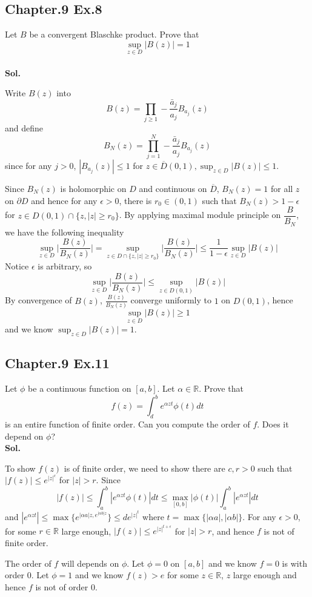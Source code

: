 \documentclass[lang=en,11pt,a4paper,citestyle =authoryear]{elegantpaper}
\newcommand{\R}{\mathbb{R}}
\begin{document}
\subsection*{Chapter.9 Ex.8} 
Let $B$ be a convergent Blaschke product. Prove that
\[\sup_{z\in D} |B(z)| = 1\]
\vspace{0.5em}\\
\textbf{Sol.} \par
Write $B(z)$ into
\[B(z) = \prod_{j\geq 1} -\dfrac{\bar{a}_j}{a_j} B_{a_j}(z)\]
and define
\[B_N(z) = \prod_{j=1}^N -\dfrac{\bar{a}_j}{a_j} B_{a_j}(z)\]
since for any $j>0$, $|B_{a_j}(z)| \leq 1$ for $z\in \overline{D}(0,1), \sup_{z\in D}|B(z)| \leq 1$.\par
Since $B_N(z)$ is holomorphic on $D$ and continuous on $\overline{D}$, $B_N(z) = 1$ for all $z$ on $\partial D$ and hence for any $\epsilon > 0$, there is $r_0\in(0,1)$ such that $B_N(z) > 1-\epsilon$ for $z\in D(0,1)\cap\{z,|z|\geq r_0\}$. By applying maximal module principle on $\dfrac{B}{B_N}$, we have the following inequality
\[
\sup_{z\in D}\Big|\dfrac{B(z)}{B_N(z)}\Big| = \sup_{z\in D\cap \{z,|z|\geq r_0\}}\Big|\dfrac{B(z)}{B_N(z)}\Big| \leq \dfrac{1}{1-\epsilon} \sup_{z\in D}|B(z)|
\]
Notice $\epsilon$ is arbitrary, so 
\[
\sup_{z\in D}\Big|\dfrac{B(z)}{B_N(z)}\Big| \leq \sup_{z\in D(0,1)}|B(z)|
\]
By convergence of $B(z)$, $\tfrac{B(z)}{B_N(z)}$ converge uniformly to $1$ on $D(0,1)$, hence
\[\sup_{z\in D}|B(z)| \geq 1\]
and we know $\sup_{z\in D}|B(z)| = 1$.
\vspace{0.5em}

\subsection*{Chapter.9 Ex.11} 
Let $\phi$ be a continuous function on $[a,b]$. Let $\alpha \in \R$. Prove that
\[f(z) = \int_d^b e^{\alpha zt}\phi(t)dt\]
is an entire function of finite order. Can you compute the order of $f$. Does it depend on $\phi$?
\vspace{0.5em}\\
\textbf{Sol.} \par
To show $f(z)$ is of finite order, we need to show there are $c,r > 0$ such that $|f(z)| \leq e^{|z|^c}$ for $|z| > r$. Since
\[
|f(z)| \leq \int_a^b |e^{\alpha zt}\phi(t)|dt \leq \max_{[0,b]}|\phi(t)|\int_a^b|e^{\alpha zt}|dt
\]
and $|e^{\alpha zt}| \leq \max\{e^{|\alpha a|z, e^{|\alpha b|z}}\} \leq de^{|z|^t}$ where $t = \max\{|\alpha a|,|\alpha b|\}$. For any $\epsilon > 0$, for some $r\in\R$ large enough, $|f(z)| \leq e^{|z|^{t+\epsilon}}$ for $|z|>r$, and hence $f$ is not of finite order.\par
The order of $f$ will depends on $\phi$. Let $\phi = 0$ on $[a,b]$ and we know $f=0$ is with order $0$. Let $\phi = 1$ and we know $f(z) > e$ for some $z\in \R$, $z$ large enough and hence $f$ is not of order $0$.
\vspace{0.5em}
\end{document}
